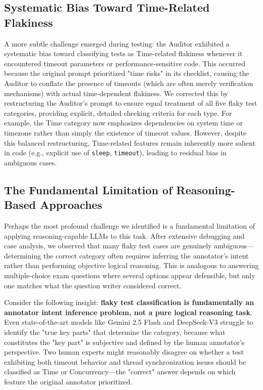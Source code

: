 \documentclass{article}
\begin{document}
\subsection{Systematic Bias Toward Time-Related Flakiness}

A more subtle challenge emerged during testing: the Auditor exhibited a systematic bias toward classifying tests as Time-related flakiness whenever it encountered timeout parameters or performance-sensitive code. This occurred because the original prompt prioritized "time risks" in its checklist, causing the Auditor to conflate the presence of timeouts (which are often merely verification mechanisms) with actual time-dependent flakiness. We corrected this by restructuring the Auditor's prompt to ensure equal treatment of all five flaky test categories, providing explicit, detailed checking criteria for each type. For example, the Time category now emphasizes dependencies on system time or timezone rather than simply the existence of timeout values. However, despite this balanced restructuring, Time-related features remain inherently more salient in code (e.g., explicit use of \texttt{sleep}, \texttt{timeout}), leading to residual bias in ambiguous cases.

\subsection{The Fundamental Limitation of Reasoning-Based Approaches}

Perhaps the most profound challenge we identified is a fundamental limitation of applying reasoning-capable LLMs to this task. After extensive debugging and case analysis, we observed that many flaky test cases are genuinely ambiguous—determining the correct category often requires inferring the annotator's intent rather than performing objective logical reasoning. This is analogous to answering multiple-choice exam questions where several options appear defensible, but only one matches what the question writer considered correct.

Consider the following insight: \textbf{flaky test classification is fundamentally an annotator intent inference problem, not a pure logical reasoning task}. Even state-of-the-art models like Gemini 2.5 Flash and DeepSeek-V3 struggle to identify the "true key parts" that determine the category, because what constitutes the "key part" is subjective and defined by the human annotator's perspective. Two human experts might reasonably disagree on whether a test exhibiting both timeout behavior and thread synchronization issues should be classified as Time or Concurrency—the "correct" answer depends on which feature the original annotator prioritized.
\end{document}
